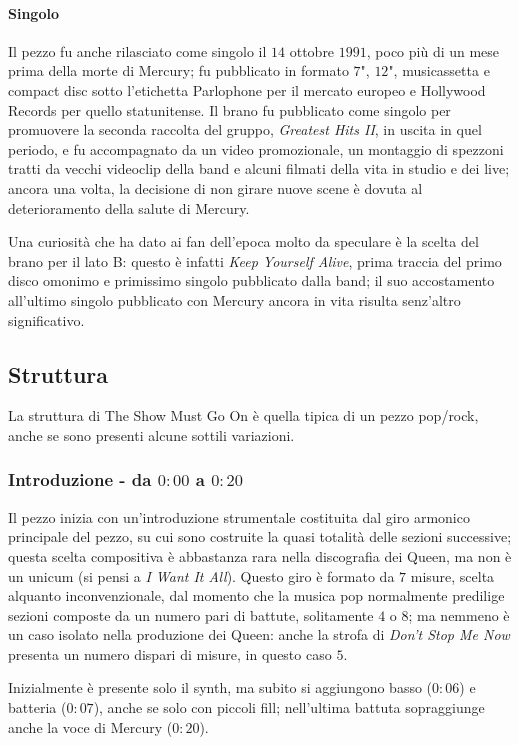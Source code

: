 \documentclass[12pt]{article}
\begin{document}
\paragraph{Singolo}
Il pezzo fu anche rilasciato come singolo il \(14\) ottobre \(1991\), poco più di un mese prima della morte di Mercury; fu pubblicato in formato \(7\)", \(12\)", musicassetta e compact disc sotto l'etichetta Parlophone per il mercato europeo e Hollywood Records per quello statunitense. Il brano fu pubblicato come singolo per promuovere la seconda raccolta del gruppo, \emph{Greatest Hits II}, in uscita in quel periodo, e fu accompagnato da un video promozionale, un montaggio di spezzoni tratti da vecchi videoclip della band e alcuni filmati della vita in studio e dei live; ancora una volta, la decisione di non girare nuove scene è dovuta al deterioramento della salute di Mercury.

Una curiosità che ha dato ai fan dell'epoca molto da speculare è la scelta del brano per il lato B: questo è infatti \emph{Keep Yourself Alive}, prima traccia del primo disco omonimo e primissimo singolo pubblicato dalla band; il suo accostamento all'ultimo singolo pubblicato con Mercury ancora in vita risulta senz'altro significativo.

\subsection{Struttura}
La struttura di The Show Must Go On è quella tipica di un pezzo pop/rock, anche se sono presenti alcune sottili variazioni.

\subsubsection*{Introduzione - da \(0:00\) a \(0:20\)}
Il pezzo inizia con un'introduzione strumentale costituita dal giro armonico principale del pezzo, su cui sono costruite la quasi totalità delle sezioni successive; questa scelta compositiva è abbastanza rara nella discografia dei Queen, ma non è un unicum (si pensi a \emph{I Want It All}). Questo giro è formato da \(7\) misure, scelta alquanto inconvenzionale, dal momento che la musica pop normalmente predilige sezioni composte da un numero pari di battute, solitamente \(4\) o \(8\); ma nemmeno è un caso isolato nella produzione dei Queen: anche la strofa di \emph{Don't Stop Me Now} presenta un numero dispari di misure, in questo caso \(5\).

Inizialmente è presente solo il synth, ma subito si aggiungono basso (\(0:06\)) e batteria (\(0:07\)), anche se solo con piccoli fill; nell'ultima battuta sopraggiunge anche la voce di Mercury (\(0:20\)).
\end{document}

